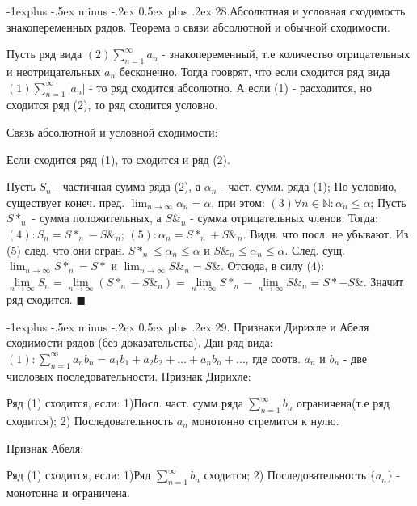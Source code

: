 \documentclass[unicode,10pt, landscape]{article}
\makeatletter
\renewcommand{\subsection}{\@startsection{subsection}{2}{0mm}%
                                {-1explus -.5ex minus -.2ex}%
                                {0.5ex plus .2ex}%
                                {\normalfont\normalsize\bfseries}}
\newenvironment{Proof} %
{\par\noindent{\bf Док-во:}} %
{\hfill$\scriptstyle\blacksquare$}
\makeatother
\begin{document}
\begin{multicols}{4}
 \subsection{28.Абсолютная и условная сходимость знакопеременных рядов. Теорема о связи абсолютной и обычной сходимости.}
 \begin{Def}
  Пусть ряд вида $(2) \sum_{n=1}^\infty a_n$ - знакопеременный, т.е количество отрицательных и неотрицательных $a_n$ бесконечно. Тогда гооврят, что если сходится ряд вида $(1) \sum_{n=1}^\infty |a_n|$ - то ряд сходится абсолютно. А если (1) - расходится, но сходится ряд (2), то ряд сходится условно.
 \end{Def}
 Связь абсолютной и условной сходимости:
 \begin{Th}
  Если сходится ряд (1), то сходится и ряд (2).
  \begin{Proof}
   Пусть $S_n$ - частичная сумма ряда (2), а $\alpha_n$ - част. сумм. ряда (1); По условию, существует конеч. пред. $\lim_{n \to \infty} \alpha_n = \alpha$, при этом: $(3)\forall n \in \mathbb{N}: \alpha_n \leq \alpha$; Пусть $S*_n$ - сумма положительных, а $S\&_n$ - сумма отрицательных членов. Тогда: $(4): S_n = S*_n - S\&_n$; $(5): \alpha_n = S*_n + S\&_n$. Видн. что посл. не убывают. Из (5) след. что они огран. $S*_n \leq \alpha_n \leq \alpha$ и $S\&_n \leq \alpha_n \leq \alpha$. След. сущ. $\lim_{n \to \infty} S*_n = S*$ и $\lim_{n \to \infty} S\&_n = S\&$. Отсюда, в силу (4):$\lim\limits_{n\rightarrow\infty }S_{n}=\lim\limits_{n\rightarrow\infty }(S*_{n}-S\&_{n})=\lim\limits_{n\rightarrow\infty }S*_{n}-\lim\limits_{n\rightarrow\infty }S\&_{n}=S*-S\&$. Значит ряд сходится.
  \end{Proof}
 \end{Th}


 \subsection{29. Признаки Дирихле и Абеля сходимости рядов (без доказательства).}
 Дан ряд вида: $(1): \sum\limits_{n=1}^{\infty}a_{n}b_{n}=a_{1}b_{1}+a_{2}b_{2}+…+a_{n}b_{n}+…$, где соотв. $a_n$ и $b_n$ - две числовых последовательности.
 Признак Дирихле:
 \begin{Th}
  Ряд (1) сходится, если: 1)Посл. част. сумм ряда $\sum_{n=1}^\infty b_n$ ограничена(т.е ряд сходится);
  2) Последовательность $a_n$ монотонно стремится к нулю.
 \end{Th}
 Признак Абеля:
 \begin{Th}
  Ряд (1) сходится, если: 1)Ряд $\sum_{n=1}^\infty b_n$ сходится; 2) Последовательность $\{a_n\}$ - монотонна и ограничена.
 \end{Th}


\end{multicols}
\end{document}

